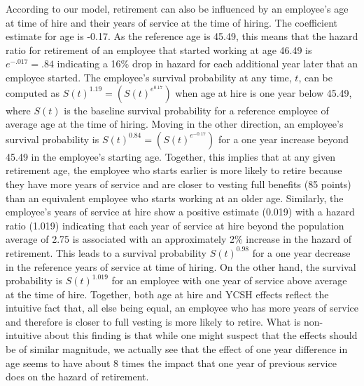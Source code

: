 \documentclass[12pt,letterpaper]{article}
\begin{document}
According to our model, retirement can also be influenced by an employee's age at time of hire and their years of service at the time of hiring.  The coefficient estimate for age is -0.17. As the reference age is 45.49, this means that the hazard ratio for retirement of an employee that started working at age 46.49 is $e^{-.017}=.84$ indicating a 16\% drop in hazard for each additional year later that an employee started. The employee's survival probability at any time, $t$, can be computed as $S(t)^{1.19} = (S(t)^{e^{0.17}})$ when age at hire is one year below 45.49,  where $S(t)$ is the baseline survival probability for a reference employee of average age at the time of hiring. Moving in the other direction, an employee's survival probability is $S(t)^{0.84}=(S(t)^{e^{-0.17}})$ for a one year increase beyond 45.49 in the employee's starting age. Together, this implies that at any given retirement age, the employee who starts earlier is more likely to retire because they have more years of service and are closer to vesting full benefits (85 points) than an equivalent employee who starts working at an older age. Similarly, the employee's years of service at hire show a positive estimate (0.019) with a hazard ratio (1.019) indicating that each year of service at hire beyond the population average of 2.75 is associated with an approximately 2\% increase in the hazard of retirement.  This leads to a survival probability $S(t)^{0.98}$ for a one year decrease in the reference years of service at time of hiring.  On the other hand, the survival probability is $S(t)^{1.019}$ for an employee with one year of service above average at the time of hire. Together, both age at hire and YCSH effects reflect the intuitive fact that, all else being equal, an employee who has more years of service and therefore is closer to full vesting is more likely to retire.  What is non-intuitive about this finding is that while one might suspect that the effects should be of similar magnitude, we actually see that the effect of one year difference in age seems to have about 8 times the impact that one year of previous service does on the hazard of retirement.
\end{document}
